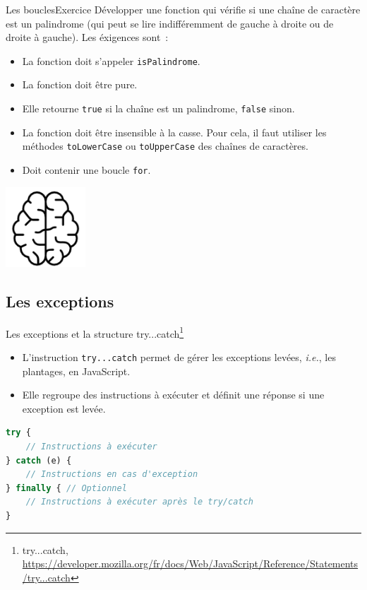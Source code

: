 \documentclass{beamer}
\begin{document}
    \begin{frame}{Les boucles}{Exercice \execcounterdispinc{}}
        Développer une fonction qui vérifie si une chaîne de caractère est un palindrome (qui peut se lire indifféremment de gauche à droite ou de droite à gauche).
        Les éxigences sont~:
        \begin{itemize}
            \item La fonction doit s'appeler \lstinline{isPalindrome}.
            \item La fonction doit être pure.
            \item Elle retourne \lstinline{true} si la chaîne est un palindrome, \lstinline{false} sinon.
            \item La fonction doit être insensible à la casse.
            Pour cela, il faut utiliser les méthodes \lstinline{toLowerCase} ou \lstinline{toUpperCase} des chaînes de caractères.
            \item Doit contenir une boucle \lstinline{for}.
        \end{itemize}
        \bigbreak
        \centering
        \includegraphics[width=3cm]{image/intelligence}
    \end{frame}

    \subsection{Les exceptions}\label{subsec:exceptions}
    \begin{frame}[fragile]{Les exceptions et la structure try...catch\footnote{\label{mozilla-try-catch}try...catch, \url{https://developer.mozilla.org/fr/docs/Web/JavaScript/Reference/Statements/try...catch}}}
        \begin{itemize}
            \item L'instruction \texttt{try...catch} permet de gérer les exceptions levées, \textit{i.e.}, les plantages, en JavaScript.
            \item Elle regroupe des instructions à exécuter et définit une réponse si une exception est levée.
        \end{itemize}
        \begin{lstlisting}[language=JavaScript,title={\tiny{Script JavaScript}}]
try {
    // Instructions à exécuter
} catch (e) {
    // Instructions en cas d'exception
} finally { // Optionnel
    // Instructions à exécuter après le try/catch
}
        \end{lstlisting}
    \end{frame}
\end{document}
